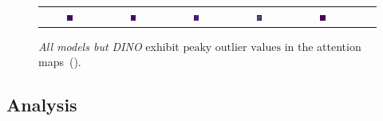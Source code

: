 \documentclass[aspectratio=169]{beamer}
\begin{document}
\begin{frame}
\begin{figure}[h]
{\begin{tabular}{c cc cc cc }
      \includegraphics[width=0.10\textwidth]{resources/230914_1202_fig2_vizs_various_models/deit3_large_patch16_224.fb_in22k_ft_in1k_1753_lastattmap.png} &
      \includegraphics[width=0.10\textwidth]{resources/230914_1202_fig2_vizs_various_models/vit_base_patch16_clip_224.laion2b_1753_lastattmap.png} &
      \includegraphics[width=0.10\textwidth]{resources/230914_1202_fig2_vizs_various_models/vit_large_patch14_clip_224.laion2b_1753_lastattmap.png} &
      \includegraphics[width=0.10\textwidth]{resources/230914_1202_fig2_vizs_various_models/vit_base_patch16_224.dino_1753_lastattmap.png} &
      \includegraphics[width=0.10\textwidth]{resources/230914_1202_fig2_vizs_various_models/vit_giant_patch14_dinov2.lvd142m_1753_lastattmap.png}
      \\
    \end{tabular}
    }
    \vspace{-0.6em}
    \caption{
      \emph{All models but DINO} exhibit $\boxed{\text{peaky outlier values}}$ in the attention maps~(\cite{darcetVisionTransformersNeed2024}).
    }  
    \label{fig:allvits}
\end{figure}
\end{frame}


\subsection{Analysis}
\end{document}
